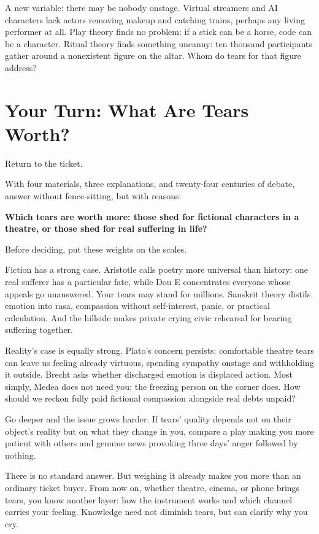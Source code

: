 A new variable: there may be nobody onstage. Virtual streamers and AI characters lack actors removing makeup and catching trains, perhaps any living performer at all. Play theory finds no problem: if a stick can be a horse, code can be a character. Ritual theory finds something uncanny: ten thousand participants gather around a nonexistent figure on the altar. Whom do tears for that figure address?

\section{Your Turn: What Are Tears Worth?}
Return to the ticket.

With four materials, three explanations, and twenty-four centuries of debate, answer without fence-sitting, but with reasons:

\textbf{Which tears are worth more: those shed for fictional characters in a theatre, or those shed for real suffering in life?}

Before deciding, put these weights on the scales.

Fiction has a strong case. Aristotle calls poetry more universal than history: one real sufferer has a particular fate, while Dou E concentrates everyone whose appeals go unanswered. Your tears may stand for millions. Sanskrit theory distils emotion into rasa, compassion without self-interest, panic, or practical calculation. And the hillside makes private crying civic rehearsal for bearing suffering together.

Reality's case is equally strong. Plato's concern persists: comfortable theatre tears can leave us feeling already virtuous, spending sympathy onstage and withholding it outside. Brecht asks whether discharged emotion is displaced action. Most simply, Medea does not need you; the freezing person on the corner does. How should we reckon fully paid fictional compassion alongside real debts unpaid?

Go deeper and the issue grows harder. If tears' quality depends not on their object's reality but on what they change in you, compare a play making you more patient with others and genuine news provoking three days' anger followed by nothing.

There is no standard answer. But weighing it already makes you more than an ordinary ticket buyer. From now on, whether theatre, cinema, or phone brings tears, you know another layer: how the instrument works and which channel carries your feeling. Knowledge need not diminish tears, but can clarify why you cry.
